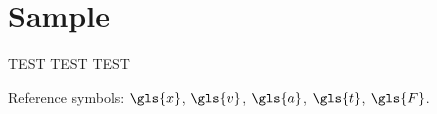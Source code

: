 \chapter{Sample}

TEST TEST TEST

Reference symbols: $\gls{x}$, $\gls{v}$, $\gls{a}$, $\gls{t}$,
$\gls{F}$.
\newpage